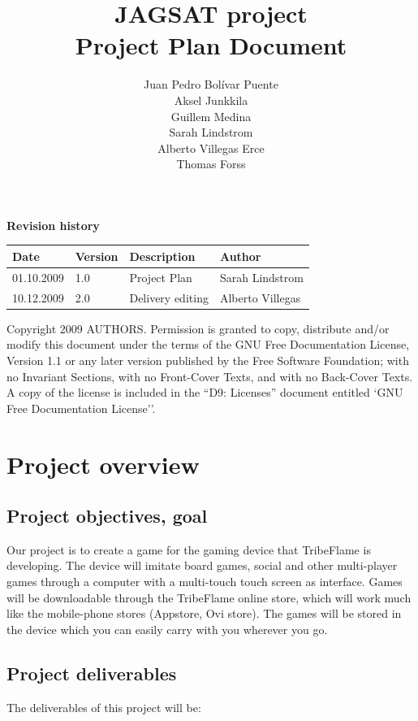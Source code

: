 \documentclass[12pt,a4paper]{article}
\title{\large JAGSAT project\\\huge Project Plan Document}
\author{
  Juan Pedro Bolívar Puente\\ 
  Aksel Junkkila\\
  Guillem Medina\\ 
  Sarah Lindstrom\\ 
  Alberto Villegas Erce\\ 
  Thomas Forss
}
\begin{document}
\maketitle

\begin{center}
\textbf {Revision history}

\begin{tabular}{ l | l | l | l }
Date			&Version	&Description		&Author\\\hline\hline
01.10.2009	&1.0		&Project Plan 		&Sarah Lindstrom\\
10.12.2009	&2.0		&Delivery editing	&Alberto Villegas
\end{tabular}
\label{tab:rev}
\end{center}

\vfill
Copyright 2009 AUTHORS.
Permission is granted to copy, distribute and/or modify this document under the terms of the GNU Free Documentation License, Version 1.1 or any later version published by the Free Software Foundation;  with no Invariant Sections, with no Front-Cover Texts, and with no Back-Cover Texts. A copy of the license is included in the ``D9: Licenses''  document entitled `GNU Free Documentation License''.

\pagebreak
\tableofcontents
\pagebreak

\section{Project overview}

\subsection{Project objectives, goal}

Our project is to create a game for the gaming device that TribeFlame
is developing. The device will imitate board games, social and other
multi-player games through a computer with a multi-touch touch screen
as interface. Games will be downloadable through the TribeFlame online
store, which will work much like the mobile-phone stores (Appstore,
Ovi store). The games will be stored in the device which you can
easily carry with you wherever you go.

\subsection{Project deliverables}

The deliverables of this project will be:
\end{document}
